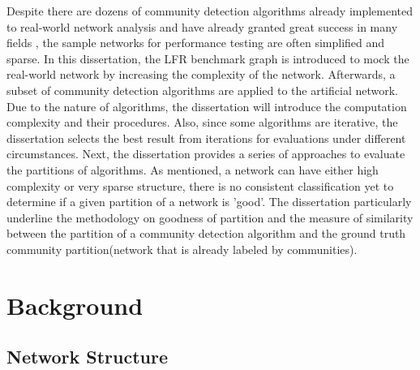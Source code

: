 \documentclass[12pt]{article}
\begin{document}
Despite there are dozens of community detection algorithms already implemented to real-world network analysis and have already granted great success in many fields \cite{2,3}, the sample networks for performance testing are often simplified and sparse. In this dissertation, the LFR benchmark graph is introduced to mock the real-world network by increasing the complexity of the network. Afterwards, a subset of community detection algorithms are applied to the artificial network. Due to the nature of algorithms, the dissertation will introduce the computation complexity and their procedures. Also, since some algorithms are iterative, the dissertation selects the best result from iterations for evaluations under different circumstances. Next, the dissertation provides a series of approaches to evaluate the partitions of algorithms. As mentioned, a network can have either high complexity or very sparse structure, there is no consistent classification yet to determine if a given partition of a network is 'good'. The dissertation particularly underline the methodology on goodness of partition and the measure of similarity between the partition of a community detection algorithm and the ground truth community partition(network that is already labeled by communities).

\section{Background}

\subsection{Network Structure}
\end{document}
